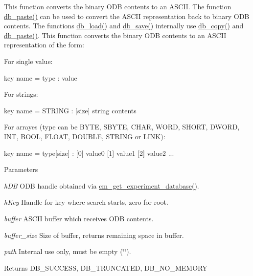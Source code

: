 This function converts the binary ODB contents to an ASCII. The function \hyperlink{group__odbfunctionc_gac1bf8d648ef2ddb1ac6243e5e11dedf2}{db\_\-paste()} can be used to convert the ASCII representation back to binary ODB contents. The functions \hyperlink{group__odbfunctionc_ga437034642fc8851bfa67937635cb7d12}{db\_\-load()} and \hyperlink{group__odbfunctionc_ga6f9a61b316a1c2a5c9c143fc84edf63b}{db\_\-save()} internally use \hyperlink{group__odbfunctionc_ga165f2428c082852ff2ac1e8c4c78d607}{db\_\-copy()} and \hyperlink{group__odbfunctionc_gac1bf8d648ef2ddb1ac6243e5e11dedf2}{db\_\-paste()}. This function converts the binary ODB contents to an ASCII representation of the form:
\begin{DoxyItemize}
\item For single value: 
\begin{DoxyCode}
 key name = type : value
\end{DoxyCode}

\item For strings: 
\begin{DoxyCode}
key name = STRING : [size] string contents
\end{DoxyCode}

\item For arrayes (type can be BYTE, SBYTE, CHAR, WORD, SHORT, DWORD, INT, BOOL, FLOAT, DOUBLE, STRING or LINK): 
\begin{DoxyCode}
key name = type[size] :
 [0] value0
 [1] value1
 [2] value2
 ...
\end{DoxyCode}
 
\begin{DoxyParams}{Parameters}
\item[{\em hDB}]ODB handle obtained via \hyperlink{group__cmfunctionc_ga16b33b70783a3f5ba98b4094149d12b7}{cm\_\-get\_\-experiment\_\-database()}. \item[{\em hKey}]Handle for key where search starts, zero for root. \item[{\em buffer}]ASCII buffer which receives ODB contents. \item[{\em buffer\_\-size}]Size of buffer, returns remaining space in buffer. \item[{\em path}]Internal use only, must be empty (\char`\"{}\char`\"{}). \end{DoxyParams}
\begin{DoxyReturn}{Returns}
DB\_\-SUCCESS, DB\_\-TRUNCATED, DB\_\-NO\_\-MEMORY 
\end{DoxyReturn}

\end{DoxyItemize}

